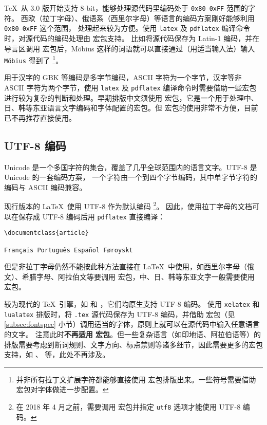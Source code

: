 \TeX\ 从 3.0 版开始支持 8-bit，能够处理源代码里编码处于 \texttt{0x80}--\texttt{0xFF} 范围的字符。
西欧（拉丁字母）、俄语系（西里尔字母）等语言的编码方案刚好能够利用 \texttt{0x80}--\texttt{0xFF} 这个范围，
处理起来较为方便。使用 \texttt{latex} 及 \texttt{pdflatex} 编译命令时，对源代码的编码处理由  宏包支持。
比如将源代码保存为 Latin-1 编码，并在导言区调用  宏包后，M\"obius 这样的词语就可以直接通过（用适当输入法）输入 \texttt{M\"obius} 得到了%
\footnote{并非所有拉丁文扩展字符都能够直接使用  宏包排版出来。一些符号需要借助  宏包对字体做进一步配置。}。

用于汉字的 GBK 等编码是多字节编码，ASCII 字符为一个字节，汉字等非 ASCII 字符为两个字节，使用
\texttt{latex} 及 \texttt{pdflatex} 编译命令时需要借助一些宏包进行较为复杂的判断和处理。早期排版中文须使用  宏包，它是一个用于处理中、日、韩等东亚语言文字编码和字体配置的宏包。但  宏包的使用非常不方便，目前已不再推荐直接使用。

\subsection{UTF-8 编码}\label{subsec:utf8}

Unicode 是一个多国字符的集合，覆盖了几乎全球范围内的语言文字。UTF-8 是 Unicode 的一套编码方案，
一个字符由一个到四个字节编码，其中单字节字符的编码与 ASCII 编码兼容。

现行版本的 \LaTeX\ 使用 UTF-8 作为默认编码%
\footnote{在 2018 年 4 月之前，需要调用  宏包并指定 \texttt{utf8} 选项才能使用 UTF-8 编码。}。
因此，使用拉丁字母的文档可以在保存成 UTF-8 编码后用 \texttt{pdflatex} 直接编译：

\begin{verbatim}
\documentclass{article}

Français Português Español Føroyskt

\end{verbatim}

但是非拉丁字母仍然不能按此种方法直接在 \LaTeX\ 中使用，如西里尔字母（俄文）、希腊字母、阿拉伯文等要调用  宏包，中、日、韩等东亚文字一般需要使用  宏包。

较为现代的 \TeX\ 引擎，如  和 ，它们均原生支持 UTF-8 编码。
使用 \texttt{xelatex} 和 \texttt{lualatex} 排版时，将 \texttt{.tex} 源代码保存为 UTF-8 编码，并借助
 宏包（见 \ref{subsec:fontspec} 小节）调用适当的字体，原则上就可以在源代码中输入任意语言的文字。
注意此时\textbf{不再适用  宏包}。但一些复杂语言（如印地语、阿拉伯语等）的排版需要考虑到断词规则、文字方向、标点禁则等诸多细节，因此需要更多的宏包支持，如 、  等，此处不再涉及。

